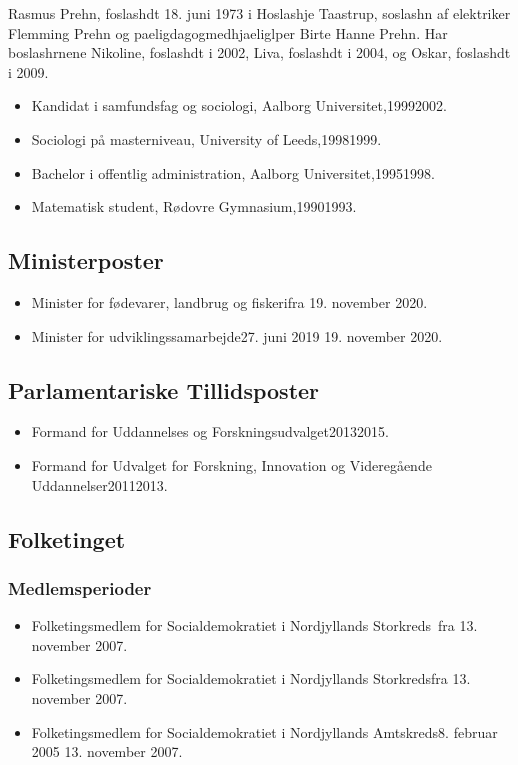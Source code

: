 \documentclass[11pt, a4paper]{awesome-cv}
\begin{document}
\makecvheader[R]
\makelettertitle
\begin{cvletter}
Rasmus Prehn, foslashdt 18. juni 1973 i Hoslashje Taastrup, soslashn af elektriker Flemming Prehn og paeligdagogmedhjaeliglper Birte Hanne Prehn. Har boslashrnene Nikoline, foslashdt i 2002, Liva, foslashdt i 2004, og Oskar, foslashdt i 2009.

\begin{itemize}
\item Kandidat i samfundsfag og sociologi, Aalborg Universitet,19992002.
\item Sociologi på masterniveau, University of Leeds,19981999.
\item Bachelor i offentlig administration, Aalborg Universitet,19951998.
\item Matematisk student, Rødovre Gymnasium,19901993.
\end{itemize}
\subsection*{Ministerposter}
\begin{itemize}
\item Minister for fødevarer, landbrug og fiskerifra 19. november 2020.
\item Minister for udviklingssamarbejde27. juni 2019  19. november 2020.
\end{itemize}
\subsection*{Parlamentariske Tillidsposter}
\begin{itemize}
\item Formand for Uddannelses og Forskningsudvalget20132015.
\item Formand for Udvalget for Forskning, Innovation og Videregående Uddannelser20112013.
\end{itemize}
\subsection*{Folketinget}
\subsubsection*{Medlemsperioder}
\begin{itemize}
\item Folketingsmedlem for Socialdemokratiet i Nordjyllands Storkreds fra 13. november 2007.
\item Folketingsmedlem for Socialdemokratiet i Nordjyllands Storkredsfra 13. november 2007.
\item Folketingsmedlem for Socialdemokratiet i Nordjyllands Amtskreds8. februar 2005  13. november 2007.
\end{itemize}

\end{cvletter}
\end{document}
